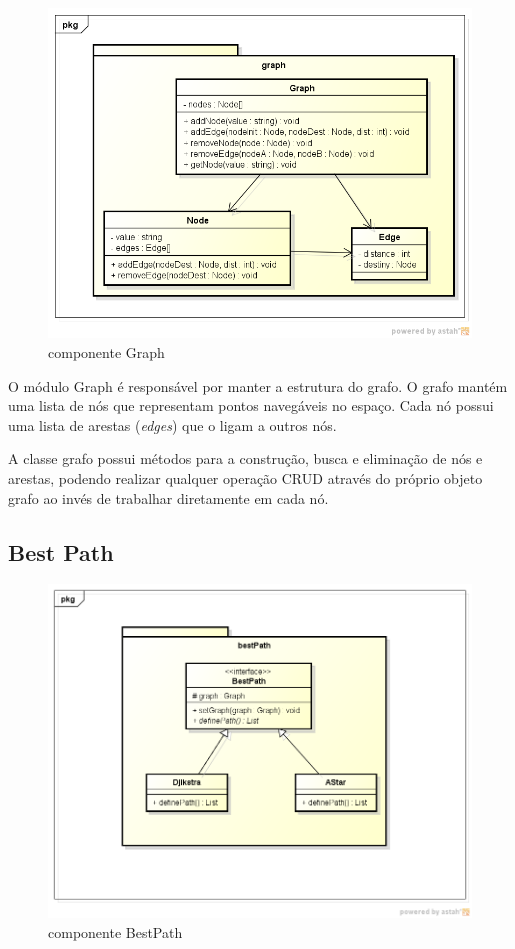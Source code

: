 \begin{figure}[h]
	\centering
	\label{fig25}
		\includegraphics[keepaspectratio=true,scale=0.5]{figuras/pkggraph.png}
	\caption{componente Graph}
\end{figure}

O módulo Graph é responsável por manter a estrutura do grafo. O grafo mantém uma lista de nós que representam pontos navegáveis no espaço. Cada nó possui uma lista de arestas (\textit{edges}) que o ligam a outros nós.

A classe grafo possui métodos para a construção, busca e eliminação de nós e arestas, podendo realizar qualquer operação CRUD através do próprio objeto grafo ao invés de trabalhar diretamente em cada nó.

\subsection{Best Path}

\begin{figure}[h]
	\centering
	\label{fig26}
		\includegraphics[keepaspectratio=true,scale=0.5]{figuras/pkgbestPath.png}
	\caption{componente BestPath}
\end{figure}

